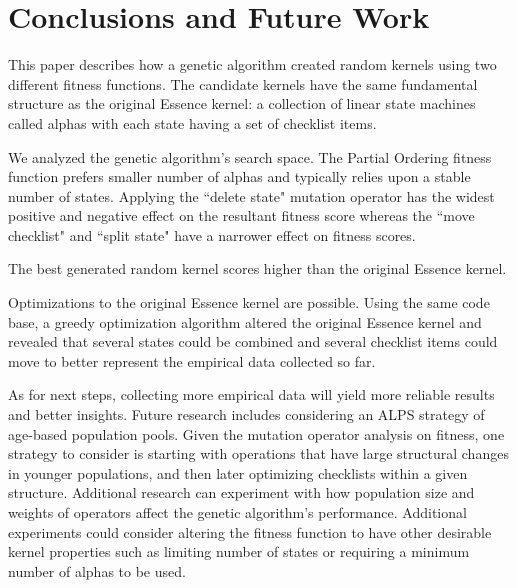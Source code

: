 \documentclass[preprint,12pt,3p]{elsarticle}
\begin{document}
\section{Conclusions and Future Work}

This paper describes how a genetic algorithm created random kernels using two different fitness functions. The candidate kernels have the same fundamental structure as the original Essence kernel: a collection of linear state machines called alphas with each state having a set of checklist items. 

We analyzed the genetic algorithm's search space. The Partial Ordering fitness function prefers smaller number of alphas and typically relies upon a stable number of states. Applying the ``delete state" mutation operator has the widest positive and negative effect on the resultant fitness score whereas the ``move checklist" and ``split state" have a narrower effect on fitness scores. 


The best generated random kernel scores higher than the original Essence kernel. 

Optimizations to the original Essence kernel are possible. Using the same code base, a greedy optimization algorithm altered the original Essence kernel and revealed that several states could be combined and several checklist items could move to better represent the empirical data collected so far.

As for next steps, collecting more empirical data will yield more reliable results and better insights. Future research includes considering an ALPS strategy \cite{ALPS} of age-based population pools. Given the mutation operator analysis on fitness, one strategy to consider is starting with operations that have large structural changes in younger populations, and then later optimizing checklists within a given structure. Additional research can experiment with how population size and weights of operators affect the genetic algorithm's performance. Additional experiments could consider altering the fitness function to have other desirable kernel properties such as limiting number of states or requiring a minimum number of alphas to be used.
\end{document}
